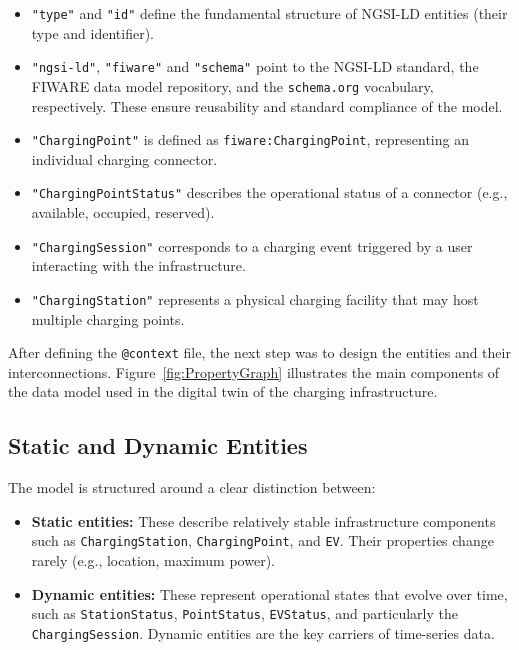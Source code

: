 \begin{itemize}
        \item \texttt{"type"} and \texttt{"id"} define the fundamental structure of NGSI-LD entities (their type and identifier).
        \item \texttt{"ngsi-ld"}, \texttt{"fiware"} and \texttt{"schema"} point to the NGSI-LD standard, the FIWARE data model repository, and the \texttt{schema.org} vocabulary, respectively. These ensure reusability and standard compliance of the model.
        \item \texttt{"ChargingPoint"} is defined as \texttt{fiware:ChargingPoint}, representing an individual charging connector.
        \item \texttt{"ChargingPointStatus"} describes the operational status of a connector (e.g., available, occupied, reserved).
        \item \texttt{"ChargingSession"} corresponds to a charging event triggered by a user interacting with the infrastructure.
        \item \texttt{"ChargingStation"} represents a physical charging facility that may host multiple charging points.
\end{itemize}

After defining the \texttt{@context} file, the next step was to design the entities and their interconnections. 
Figure~\ref{fig:PropertyGraph} illustrates the main components of the data model used in the digital twin of the charging infrastructure. 

\subsection*{Static and Dynamic Entities}
The model is structured around a clear distinction between:
\begin{itemize}
    \item \textbf{Static entities:} These describe relatively stable infrastructure components such as \texttt{ChargingStation}, \texttt{ChargingPoint}, and \texttt{EV}. Their properties change rarely (e.g., location, maximum power).
    \item \textbf{Dynamic entities:} These represent operational states that evolve over time, such as \texttt{StationStatus}, \texttt{PointStatus}, \texttt{EVStatus}, and particularly the \texttt{ChargingSession}. Dynamic entities are the key carriers of time-series data.
\end{itemize}

